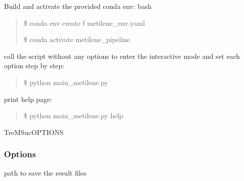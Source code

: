 \documentclass[letterpaper,10pt,english]{sphinxmanual}
\begin{document}
\sphinxAtStartPar
Build and activate the provided conda env:
bash
\begin{quote}

\sphinxAtStartPar
\$ conda env create \sphinxhyphen{}f metilene\_env.yaml

\sphinxAtStartPar
\$ conda activate metilene\_pipeline
\end{quote}

\sphinxAtStartPar
call the script without any options to enter the interactive mode and set
each option step by step:
\begin{quote}

\sphinxAtStartPar
\$ python main\_metilene.py
\end{quote}

\sphinxAtStartPar
print help page:
\begin{quote}

\sphinxAtStartPar
\$ python main\_metilene.py \sphinxhyphen{}\sphinxhyphen{}help
\end{quote}

\begin{sphinxVerbatim}[commandchars=\\\{\}]
TreMSuc\PYG{o}{[}OPTIONS\PYG{o}{]}
\end{sphinxVerbatim}
\subsubsection*{Options}

\begin{fulllineitems}
\label{\detokenize{index:cmdoption-TreMSuc-o}}\label{\detokenize{index:cmdoption-TreMSuc-out_path}}
\pysigstartsignatures
{}
\pysigstopsignatures
\sphinxAtStartPar
path to save the result files
\begin{quote}\begin{description}
\sphinxAtStartPar
{}

\end{description}\end{quote}

\end{fulllineitems}
\end{document}
